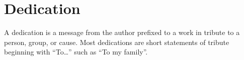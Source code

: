 \chapter{Dedication}
A dedication is a message from the author prefixed to a work in tribute to a person, group, or cause. Most dedications are short statements of tribute beginning with “To…” such as “To my family”.